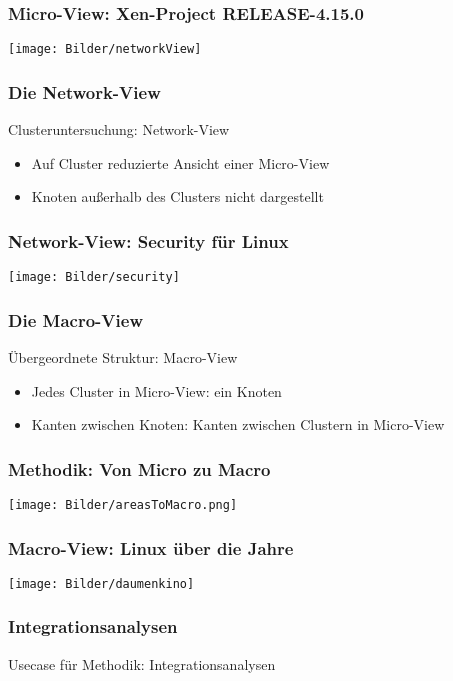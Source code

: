 \documentclass{beamer}
\begin{document}
	\begin{frame}
	\frametitle{Micro-View: Xen-Project RELEASE-4.15.0}
	\centering
	\texttt{[image: Bilder/networkView]}
	\end{frame}

	\begin{frame}
	\frametitle{Die Network-View}
		\begin{block}{Clusteruntersuchung: Network-View}
			\begin{itemize}
				\item Auf Cluster reduzierte Ansicht einer Micro-View
				\item Knoten außerhalb des Clusters nicht dargestellt
			\end{itemize}
		\end{block}
	\end{frame}


	\begin{frame}
	\frametitle{Network-View: Security für Linux}
	\centering
	\texttt{[image: Bilder/security]}
	\end{frame}

	\begin{frame}
	\frametitle{Die Macro-View}
		\begin{block}{Übergeordnete Struktur: Macro-View}
			\begin{itemize}
				\item Jedes Cluster in Micro-View: ein Knoten
				\item Kanten zwischen Knoten: Kanten zwischen Clustern in Micro-View
			\end{itemize}
		\end{block}
	\end{frame}

	\begin{frame}
	\frametitle{Methodik: Von Micro zu Macro}
	\centering
	\texttt{[image: Bilder/areasToMacro.png]}
	\end{frame}


	\begin{frame}
	\frametitle{Macro-View: Linux über die Jahre}
	\centering
	\texttt{[image: Bilder/daumenkino]}
	\end{frame}

	\begin{frame}
	\frametitle{Integrationsanalysen}
		\begin{center}
			\Huge Usecase für Methodik: Integrationsanalysen
		\end{center}
		
	\end{frame}
\end{document}
